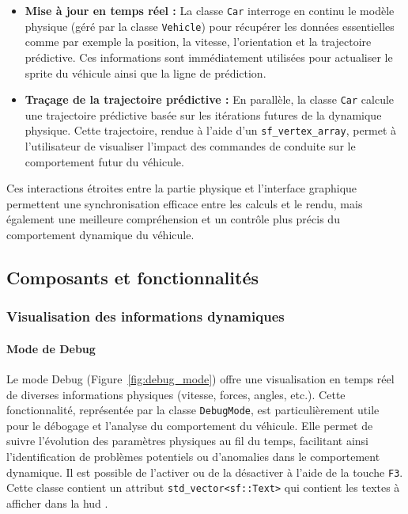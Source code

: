 \begin{itemize}
    \item \textbf{Mise à jour en temps réel :} La classe \texttt{Car} interroge en continu le modèle physique (géré par la classe \texttt{Vehicle}) pour récupérer les données essentielles comme par exemple la position, la vitesse, l'orientation et la trajectoire prédictive.
    Ces informations sont immédiatement utilisées pour actualiser le \gls{sprite} du véhicule ainsi que la ligne de prédiction.
    \item \textbf{Traçage de la trajectoire prédictive :} En parallèle, la classe \texttt{Car} calcule une trajectoire prédictive basée sur les itérations futures de la dynamique physique.
    Cette trajectoire, rendue à l'aide d'un \texttt{\gls{sf_vertex_array}}\cite{sfml_sf_vertexarray}, permet à l'utilisateur de visualiser l'impact des commandes de conduite sur le comportement futur du véhicule.
\end{itemize}

Ces interactions étroites entre la partie physique et l'interface graphique permettent une synchronisation efficace entre les calculs et le rendu, mais également une meilleure compréhension et un contrôle plus précis du comportement dynamique du véhicule.


\subsection{Composants et fonctionnalités}\label{subsec:composants-et-fonctionnalites}

\subsubsection{Visualisation des informations dynamiques}\label{subsubsec:visualisation-des-informations-dynamiques}

\paragraph{Mode de Debug}
Le mode Debug (Figure~\ref{fig:debug_mode}) offre une visualisation en temps réel de diverses informations physiques (vitesse, forces, angles, etc.).
Cette fonctionnalité, représentée par la classe \texttt{DebugMode}, est particulièrement utile pour le débogage et l'analyse du comportement du véhicule.
Elle permet de suivre l'évolution des paramètres physiques au fil du temps, facilitant ainsi l'identification de problèmes potentiels ou d'anomalies dans le comportement dynamique.
Il est possible de l'activer ou de la désactiver à l'aide de la touche \texttt{F3}.
Cette classe contient un attribut \texttt{\gls{std_vector}<sf::Text>}\cite{cpp_reference_vector} qui contient les textes à afficher dans la \gls{hud} .


